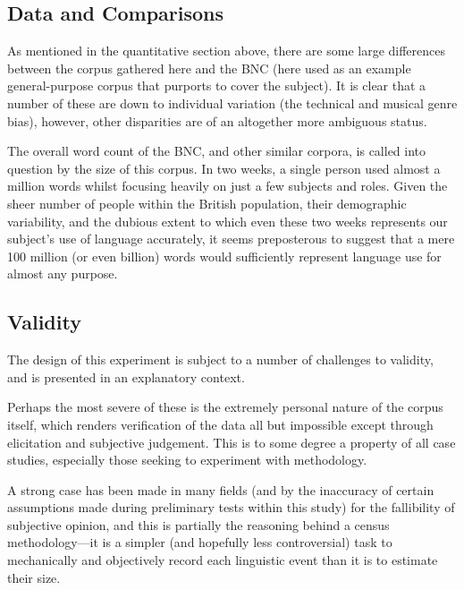 \subsection{Data and Comparisons}

As mentioned in the quantitative section above, there are some large differences between the corpus gathered here and the BNC (here used as an example general-purpose corpus that purports to cover the subject).  It is clear that a number of these are down to individual variation (the technical and musical genre bias), however, other disparities are of an altogether more ambiguous status.

The overall word count of the BNC, and other similar corpora, is called into question by the size of this corpus.  In two weeks, a single person used almost a million words whilst focusing heavily on just a few subjects and roles.  Given the sheer number of people within the British population, their demographic variability, and the dubious extent to which even these two weeks represents our subject's use of language accurately, it seems preposterous to suggest that a mere 100 million (or even billion) words would sufficiently represent language use for almost any purpose.











\subsection{Validity}
The design of this experiment is subject to a number of challenges to validity, and is presented in an explanatory context.

Perhaps the most severe of these is the extremely personal nature of the corpus itself, which renders verification of the data all but impossible except through elicitation and subjective judgement.  This is to some degree a property of all case studies, especially those seeking to experiment with methodology.

A strong case has been made in many fields (and by the inaccuracy of certain assumptions made during preliminary tests within this study) for the fallibility of subjective opinion, and this is partially the reasoning behind a census methodology---it is a simpler (and hopefully less controversial) task to mechanically and objectively record each linguistic event than it is to estimate their size.

